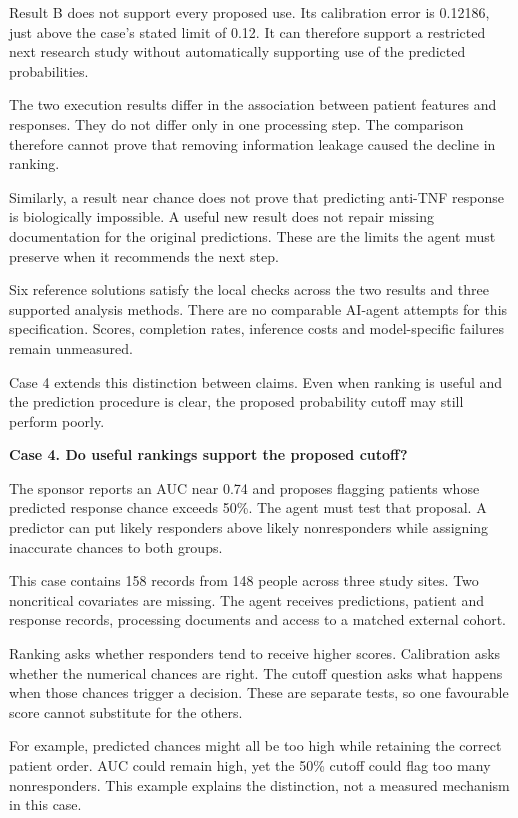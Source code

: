 \documentclass[10pt,a4paper]{article}
\newcommand{\reportcase}[2]{{\Large\bfseries Case #1. #2\par}\vspace{2mm}}
\newcommand{\reporthead}[1]{\vspace{2mm}{\normalsize\bfseries #1\par}}
\begin{document}
Result B does not support every proposed use. Its calibration error is 0.12186, just above the case's stated limit of 0.12. It can therefore support a restricted next research study without automatically supporting use of the predicted probabilities.

\reporthead{What the agent must not conclude}
The two execution results differ in the association between patient features and responses. They do not differ only in one processing step. The comparison therefore cannot prove that removing information leakage caused the decline in ranking.

Similarly, a result near chance does not prove that predicting anti-TNF response is biologically impossible. A useful new result does not repair missing documentation for the original predictions. These are the limits the agent must preserve when it recommends the next step.

\reporthead{What is known so far}
Six reference solutions satisfy the local checks across the two results and three supported analysis methods. There are no comparable AI-agent attempts for this specification. Scores, completion rates, inference costs and model-specific failures remain unmeasured.

Case 4 extends this distinction between claims. Even when ranking is useful and the prediction procedure is clear, the proposed probability cutoff may still perform poorly.

\newpage
\reportcase{4}{Do useful rankings support the proposed cutoff?}
The sponsor reports an AUC near 0.74 and proposes flagging patients whose predicted response chance exceeds 50\%. The agent must test that proposal. A predictor can put likely responders above likely nonresponders while assigning inaccurate chances to both groups.

This case contains 158 records from 148 people across three study sites. Two noncritical covariates are missing. The agent receives predictions, patient and response records, processing documents and access to a matched external cohort.

\reporthead{Why the distinction matters}
Ranking asks whether responders tend to receive higher scores. Calibration asks whether the numerical chances are right. The cutoff question asks what happens when those chances trigger a decision. These are separate tests, so one favourable score cannot substitute for the others.

For example, predicted chances might all be too high while retaining the correct patient order. AUC could remain high, yet the 50\% cutoff could flag too many nonresponders. This example explains the distinction, not a measured mechanism in this case.
\end{document}
